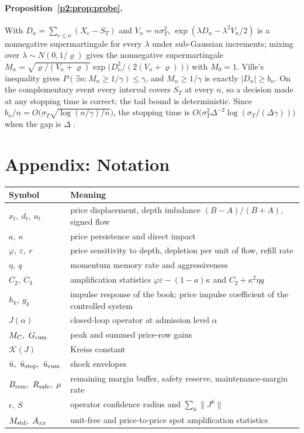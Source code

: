 \paragraph{Proposition~\ref{p2:prop:probe}.} With $D_n=\sum_{e\le n}(X_e-S_T)$ and $V_n=n\sigma_T^2$, $\exp(\lambda D_n-\lambda^2V_n/2)$ is a nonnegative supermartingale for every $\lambda$ under sub-Gaussian increments; mixing over $\lambda\sim N(0,1/\varrho)$ gives the nonnegative supermartingale $M_n=\sqrt{\varrho/(V_n+\varrho)}\exp\bigl(D_n^2/(2(V_n+\varrho))\bigr)$ with $M_0=1$. Ville's inequality \citep{p2:ville1939} gives $P(\exists n:M_n\ge1/\gamma)\le\gamma$, and $M_n\ge1/\gamma$ is exactly $|D_n|\ge b_n$. On the complementary event every interval covers $S_T$ at every $n$, so a decision made at any stopping time is correct; the tail bound is deterministic. Since $b_n/n=O\bigl(\sigma_T\sqrt{\log(n/\gamma)/n}\bigr)$, the stopping time is $O\bigl(\sigma_T^2\Delta^{-2}\log(\sigma_T/(\Delta\gamma))\bigr)$ when the gap is $\Delta$ \citep{p2:howard2021}.

\section{Appendix: Notation}\label{p2:app:notation}
\begin{longtable}{p{}p{}}
\toprule
Symbol & Meaning\\
\midrule
\endhead
$x_t,\ d_t,\ u_t$ & price displacement, depth imbalance $(B-A)/(B+A)$, signed flow\\
$a,\ \kappa$ & price persistence and direct impact\\
$\varphi,\ \varepsilon,\ r$ & price sensitivity to depth, depletion per unit of flow, refill rate\\
$\eta,\ q$ & momentum memory rate and aggressiveness\\
$C_2,\ C_3$ & amplification statistics $\varphi\varepsilon-(1-a)\kappa$ and $C_2+\kappa^2\eta q$\\
$h_k,\ g_k$ & impulse response of the book; price impulse coefficient of the controlled system\\
$J(\alpha)$ & closed-loop operator at admission level $\alpha$\\
$M_C,\ G_{\rm cum}$ & peak and summed price-row gains\\
$\mathcal K(J)$ & Kreiss constant\\
$\bar u,\ \bar u_{\rm step},\ \bar u_{\rm cum}$ & shock envelopes\\
$B_{\rm rem},\ R_{\rm safe},\ \mu$ & remaining margin buffer, safety reserve, maintenance-margin rate\\
$\epsilon,\ S$ & operator confidence radius and $\sum_k\|J^k\|$\\
$M_{\rm std},\ A_{xx}$ & unit-free and price-to-price spot amplification statistics\\
\bottomrule
\end{longtable}

